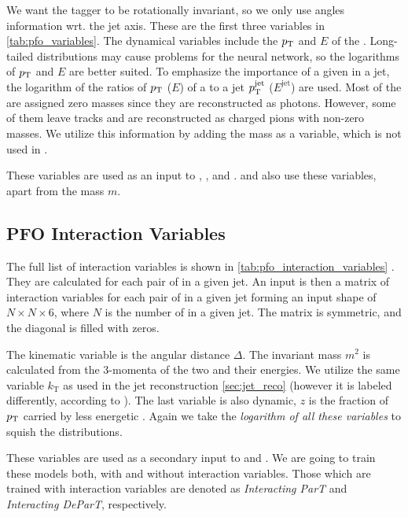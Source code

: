 We want the tagger to be rotationally invariant, so we only use angles information wrt. the jet axis.
These are the first three variables in \cref{tab:pfo_variables}.
The dynamical variables include the $p_\text{T}$ and $E$ of the \PFO.
Long-tailed distributions may cause problems for the neural network, so the logarithms of $p_\text{T}$ and $E$ are better suited. 
To emphasize the importance of a given \PFO in a jet, the logarithm of the ratios of $p_\text{T}$ ($E$) of a \PFO to a jet $p_\text{T}^\mathrm{jet}$ ($E^\mathrm{jet}$) are used.
Most of the \PFOs are assigned zero masses since they are reconstructed as photons.
However, some of them leave tracks and are reconstructed as charged pions with non-zero masses.
We utilize this information by adding the mass as a variable, which is not used in \cite{part}.

These variables are used as an input to \trans, \ParT, and \depart.
\PFN and \EFN also use these variables, apart from the mass $m$.

\subsection{PFO Interaction Variables}
\label{sec:pfo_interaction_variables}

The full list of \PFO interaction variables is shown in \cref{tab:pfo_interaction_variables} \cite{part}.
They are calculated for each pair of \PFOs in a given jet.
An input is then a matrix of \PFO interaction variables for each pair of \PFOs in a given jet forming an input shape of $N \times N \times 6$, where $N$ is the number of \PFOs in a given jet.
The matrix is symmetric, and the diagonal is filled with zeros.

The kinematic variable is the angular distance $\Delta$.
The invariant mass $m^2$ is calculated from the 3-momenta of the two \PFOs and their energies.
We utilize the same variable $k_\mathrm{T}$ as used in the jet reconstruction \cref{sec:jet_reco} (however it is labeled differently, according to \cite{part}).
The last variable is also dynamic, $z$ is the fraction of $p_\text{T}$ carried by less energetic \PFO.
Again we take the \emph{logarithm of all these variables} to squish the distributions. 

These variables are used as a secondary input to \ParT and \depart.
We are going to train these models both, with and without interaction variables.
Those which are trained with interaction variables are denoted as \emph{Interacting ParT} and \emph{Interacting DeParT}, respectively.


